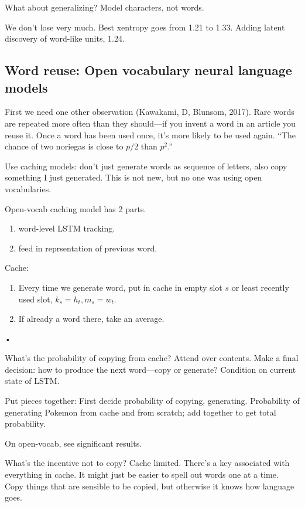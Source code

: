 What about generalizing? Model characters, not words.

We don't lose very much. Best xentropy goes from 1.21 to 1.33. Adding latent discovery of word-like units, 1.24.

\subsection{Word reuse: Open vocabulary neural language models}

First we need one other observation (Kawakami, D, Blunsom, 2017). Rare words are repeated more often than they should---if you invent a word in an article you reuse it. Once a word has been used once, it's more likely to be used again.
``The chance of two noriegas is close to $p/2$ than $p^2$.''

Use caching models: don't just generate words as sequence of letters, also copy something I just generated. This is not new, but no one was using open vocabularies.

Open-vocab caching model has 2 parts. 
\begin{enumerate}
\item
word-level LSTM tracking. 
\item
feed in reprsentation of previous word. %
\end{enumerate}
Cache: 
\begin{enumerate}
\item
Every time we generate word, put in cache in empty slot $s$ or least recently used slot, $k_s=h_t, m_s=w_t$.
\item
If already a word there, take an average.
\end{enumerate}•

What's the probability of copying from cache? Attend over contents. Make a final decision: how to produce the next word---copy or generate? Condition on current state of LSTM.



Put pieces together: First decide probability of copying, generating. Probability of generating Pokemon from cache and from scratch; add together to get total probability.

On open-vocab, see significant results.

What's the incentive not to copy? Cache limited. There's a key associated with everything in cache. It might just be easier to spell out words one at a time. Copy things that are sensible to be copied, but otherwise it knows how language goes.

